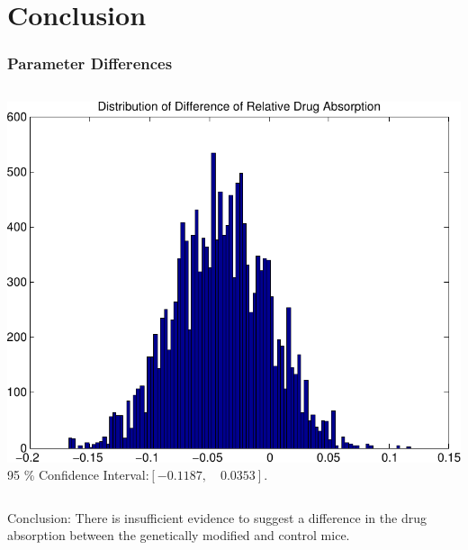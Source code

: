 \documentclass[t]{beamer}
\begin{document}
\section{Conclusion}
\begin{frame}[t]
  \frametitle{Parameter Differences}
  \begin{columns}[T]
  \includegraphics[width=\textwidth]{drug_abs_diff.pdf} 
  \vspace{2cm}
  95 \% Confidence Interval:$ [-0.1187,\quad    0.0353]$.
  \end{columns}
  \pause
  Conclusion:  There is insufficient evidence to suggest a difference in the \alert{drug absorption} between the genetically modified and control mice.
  
\end{frame}
\end{document}
